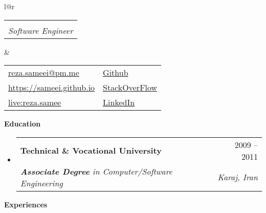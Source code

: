 \documentclass[letterpaper,12pt]{article}[leftmargin=*]
\makeatletter
\def \fullname {Reza Sameei}
\def \subtitle {Software Engineer}
\def \linkedinicon {\faLinkedin}
\def \linkedinlink {http://linkedin.com/in/reza-sameei/}
\def \linkedintext {LinkedIn}
\def \phoneicon {\faPhone}
\def \phonetext {+98-912-666-2695}
\def \skypeicon {\faSkype}
\def \skypelink {https://join.skype.com/invite/nINGOAMPxZdX}
\def \skypename {live:reza.samee}
\def \emailicon {\faEnvelope}
\def \emaillink {mailto:reza.sameei@pm.me}
\def \emailtext {reza.sameei@pm.me}
\def \githubicon {\faGithub}
\def \githublink {https://github.com/sameei}
\def \githubtext {Github}
\def \stacksiteicon {\faStackOverflow}
\def \stacksitelink {https://stackoverflow.com/users/998642/reza-sameei}
\def \stacksitetext {StackOverFlow}
\def \websiteicon {\faGlobe}
\def \websitelink {https://sameei.github.io/}
\def \websitetext {https://sameei.github.io}
\def \headertype {\doublecol} %
\def \entryspacing {-0pt}
\def \linkedin {\linkedinicon \hspace{3pt}\href{\linkedinlink}{\linkedintext}}
\def \phone {\phoneicon \hspace{3pt}{ \phonetext}}
\def \skype {\skypeicon \hspace{3pt}\href{\skypelink}{\skypename}}
\def \email {\emailicon \hspace{3pt}\href{\emaillink}{\emailtext}}
\def \github {\githubicon \hspace{3pt}\href{\githublink}{\githubtext}}
\def \stackoverflow {\stacksiteicon \hspace{3pt}\href{\stacksitelink}{\stacksitetext}}
\def \website {\websiteicon \hspace{3pt}\href{\websitelink}{\websitetext}}
\renewcommand{\section}[2]{\vspace{5pt}
  \colorbox{secondary}{\color{white}\raggedbottom\normalsize\textbf{{#1}{\hspace{7pt}#2}}}
}
\newcommand{\resumeEntryStart}{\begin{itemize}[leftmargin=2.5mm]}
\newcommand{\resumeEntryEnd}{\end{itemize}\vspace{\entryspacing}}
\newcommand{\resumeEntryTSDL}[4]{
  \vspace{-1pt}\item[]
    \begin{tabular*}{0.97\textwidth}{l@{\extracolsep{\fill}}r}
      \textbf{\color{primary}#1} & {\firabook\color{accent}\small#2} \\
      \textit{\color{accent}\small#3} & \textit{\color{accent}\small#4} \\
    \end{tabular*}\vspace{-6pt}
}
\newcommand{\resumeEntryS}[2]{
  \item[]\small{
    \textbf{\color{primary}#1 }{ #2 \vspace{-6pt}}
  }
}
\newcommand{\doublecol}[6]{
  \begin{tabular*}{\textwidth}{l@{\extracolsep{\fill}}r}
    {
      \begin{tabular}[c]{l}
        \fontsize{35}{45}\selectfont{\color{primary}{{\textbf{\fullname}}}}
		\\
        {\textit{\subtitle}} %
      \end{tabular}
    } & {
      \begin{tabular}[c]{l@{\hspace{1.5em}}l}
        {\small#4} & {\small#1} \\
        {\small#5} & {\small#2} \\
        {\small#6} & {\small#3}
      \end{tabular}
    }
  \end{tabular*}
}
\newcommand{\singlecol}[6]{
  \begin{tabular*}{\textwidth}{l@{\extracolsep{\fill}}r}
    {
      \begin{tabular}[b]{l}
        \fontsize{35}{45}\selectfont{\color{primary}{{\textbf{\fullname}}}} \\
        {\textit{\subtitle}} %
      \end{tabular}
    } & {
      \begin{tabular}[c]{l}
        {\small#1} \\
        {\small#2} \\
        {\small#3} \\
        {\small#4} \\
        {\small#5} \\
        {\small#6}
      \end{tabular}
    }
  \end{tabular*}
}
\makeatother
\begin{document}


\headertype{\github}{\stackoverflow}{\linkedin}{\email}{\website}{\skype}{} %





\section{\faGraduationCap}{Education}

  \resumeEntryStart
    \resumeEntryTSDL
      {Technical \& Vocational University}{2009 -- 2011}
      {\textbf{Associate Degree} in Computer/Software Engineering}{Karaj, Iran}
  \resumeEntryEnd

 \section{\faBicycle}{Experiences}
\end{document}
